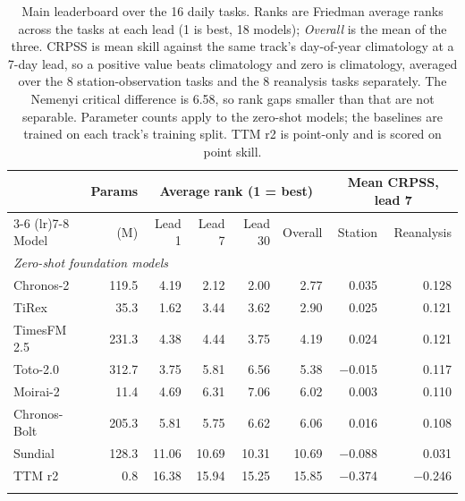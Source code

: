 \begin{table}[htbp]
  \centering
  \footnotesize
  \setlength{\tabcolsep}{4.5pt}
  \caption{Main leaderboard over the 16 daily tasks. Ranks are Friedman average ranks across the tasks at each lead (1 is best, 18 models); \emph{Overall} is the mean of the three. CRPSS is mean skill against the same track's day-of-year climatology at a 7-day lead, so a positive value beats climatology and zero is climatology, averaged over the 8 station-observation tasks and the 8 reanalysis tasks separately. The Nemenyi critical difference is 6.58, so rank gaps smaller than that are not separable. Parameter counts apply to the zero-shot models; the baselines are trained on each track's training split. TTM r2 is point-only and is scored on point skill.}
  \label{tab:leaderboard}
  \begin{tabular}{lrrrrrrr}
    \toprule
    & Params & \multicolumn{4}{c}{Average rank (1 = best)} & \multicolumn{2}{c}{Mean CRPSS, lead 7} \\
    \cmidrule(lr){3-6} \cmidrule(lr){7-8}
    Model & (M) & Lead 1 & Lead 7 & Lead 30 & Overall & Station & Reanalysis \\
    \midrule
    \multicolumn{8}{l}{\emph{Zero-shot foundation models}} \\
    Chronos-2 & \num{119.5} & \num{4.19} & \num{2.12} & \num{2.00} & \num{2.77} & \num{+0.035} & \num{+0.128} \\
    TiRex & \num{35.3} & \num{1.62} & \num{3.44} & \num{3.62} & \num{2.90} & \num{+0.025} & \num{+0.121} \\
    TimesFM 2.5 & \num{231.3} & \num{4.38} & \num{4.44} & \num{3.75} & \num{4.19} & \num{+0.024} & \num{+0.121} \\
    Toto-2.0 & \num{312.7} & \num{3.75} & \num{5.81} & \num{6.56} & \num{5.38} & \num{-0.015} & \num{+0.117} \\
    Moirai-2 & \num{11.4} & \num{4.69} & \num{6.31} & \num{7.06} & \num{6.02} & \num{+0.003} & \num{+0.110} \\
    Chronos-Bolt & \num{205.3} & \num{5.81} & \num{5.75} & \num{6.62} & \num{6.06} & \num{+0.016} & \num{+0.108} \\
    Sundial & \num{128.3} & \num{11.06} & \num{10.69} & \num{10.31} & \num{10.69} & \num{-0.088} & \num{+0.031} \\
    TTM r2 & \num{0.8} & \num{16.38} & \num{15.94} & \num{15.25} & \num{15.85} & \num{-0.374} & \num{-0.246} \\
    \addlinespace
    \multicolumn{8}{l}{\emph{Trained and statistical baselines}} \\

\end{tabular}
\end{table}
